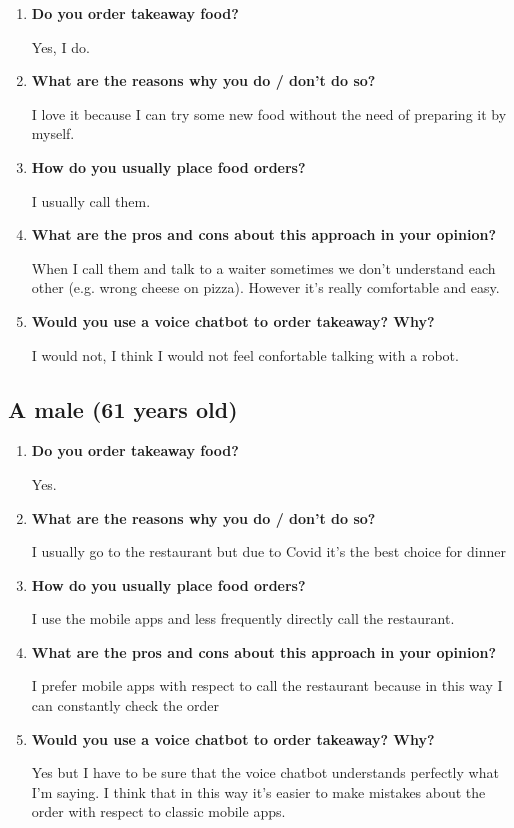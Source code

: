 \begin{enumerate}

\item \textbf{Do you order takeaway food?}

Yes, I do.

\item \textbf{What are the reasons why you do / don't do so?}

I love it because I can try some new food without the need of preparing it by myself.

\item \textbf{How do you usually place food orders?}

I usually call them.

\item \textbf{What are the pros and cons about this approach in your opinion?}

When I call them and talk to a waiter sometimes we don't understand each other (e.g. wrong cheese on pizza). However it's really comfortable and easy.

\item \textbf{Would you use a voice chatbot to order takeaway? Why?}

I would not, I think I would not feel confortable talking with a robot.

\end{enumerate}


\subsection*{A male (61 years old)}

\begin{enumerate}

\item \textbf{Do you order takeaway food?}

Yes.

\item \textbf{What are the reasons why you do / don't do so?}

I usually go to the restaurant but due to Covid it's the best choice for dinner

\item \textbf{How do you usually place food orders?}

I use the mobile apps and less frequently directly call the restaurant.

\item \textbf{What are the pros and cons about this approach in your opinion?}

I prefer mobile apps with respect to call the restaurant because in this way I can constantly check the order

\item \textbf{Would you use a voice chatbot to order takeaway? Why?}

Yes but I have to be sure that the voice chatbot understands perfectly what I'm saying. I think that in this way it's easier to make mistakes about the order with respect to classic mobile apps.

\end{enumerate}

